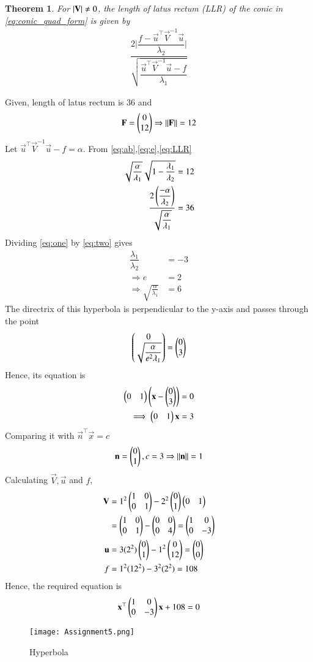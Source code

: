 \documentclass[journal,12pt,twocolumn]{IEEEtran}
\newtheorem{theorem}{Theorem}[section]
\begin{document}
\begin{theorem}
For $\vert\mathbf{V}\vert \ne 0$, the length of latus rectum (LLR) of the conic in \eqref{eq:conic_quad_form} is given by 
\begin{align} 
\dfrac{2\bigg | \dfrac{f-\vec{u}^{\top}\vec{V}^{-1}\vec{u}}{\lambda_2}\bigg | }{{\sqrt{\dfrac{\vec{u}^{\top}\vec{V}^{-1}\vec{u} -f}{\lambda_1}}}}
\label{eq:LLR}
\end{align} 
\end{theorem}
Given, length of latus rectum is 36 and
\begin{align}
    \mathbf{F} =\begin{pmatrix}0\\ 12\end{pmatrix}\Rightarrow\lVert\mathbf{F}\rVert=12
\end{align}
Let $\vec{u}^{\top}\vec{V}^{-1}\vec{u}-f=\alpha$. From \eqref{eq:ab},\eqref{eq:e},\eqref{eq:LLR}
\begin{align}
    \sqrt{\dfrac{\alpha}{\lambda_1}}\sqrt{1-\frac{\lambda_1}{\lambda_2}}=12\label{eq:one}\\
    \dfrac{2\left(\dfrac{-\alpha}{\lambda_2}\right)}{\sqrt{\dfrac{\alpha}{\lambda_1}}}=36\label{eq:two}
\end{align}
Dividing \eqref{eq:one} by \eqref{eq:two} gives
\begin{align}
    \dfrac{\lambda_1}{\lambda_2}&=-3\\
    \Rightarrow e&=2\label{eq:q}\\
    \Rightarrow \sqrt{\frac{\alpha}{\lambda_1}}&=6\label{eq:w}
\end{align}
The directrix of this hyperbola is perpendicular to the y-axis and passes through the point
\begin{align}
\begin{pmatrix}0\\\sqrt{\dfrac{\alpha}{e^2\lambda_1}}\end{pmatrix}=\begin{pmatrix}0\\3\end{pmatrix}
\end{align}
Hence, its equation is
\begin{align}
    \begin{pmatrix}0&1\end{pmatrix}\left(\mathbf{x}-\begin{pmatrix}0\\3\end{pmatrix}\right) = 0\\
    \implies \begin{pmatrix}0&1\end{pmatrix}\mathbf{x} = 3
\end{align}
Comparing it with $\vec{n}^{\top}\vec{x} = c$
\begin{align}
    \mathbf{n} = \begin{pmatrix}0\\1\end{pmatrix}, c = 3\Rightarrow \lVert\mathbf{n}\rVert = 1
\end{align}
Calculating $\vec{V}, \vec{u}$ and $f$,
\begin{align}
    \mathbf{V}&=1^2\begin{pmatrix}1&0\\0&1\end{pmatrix} - 2^2\begin{pmatrix}0\\1\end{pmatrix}\begin{pmatrix}0&1\end{pmatrix}\\
    &=\begin{pmatrix}1&0\\0&1\end{pmatrix}-\begin{pmatrix}0&0\\0&4\end{pmatrix}=\begin{pmatrix}1&0\\0&-3\end{pmatrix}\\
    \mathbf{u}&= 3(2^2)\begin{pmatrix}0\\1\end{pmatrix} - 1^2\begin{pmatrix}0\\12\end{pmatrix}=\begin{pmatrix}0\\0\end{pmatrix}\\
    f &= 1^2(12^2) - 3^2(2^2)= 108
\end{align}
Hence, the required equation is
\begin{align}
    \mathbf{x}^{\top}\begin{pmatrix}1&0\\0&-3\end{pmatrix}\mathbf{x}+108=0
\end{align}
\begin{figure}[!h]
 \centering
 \texttt{[image: Assignment5.png]}
 \caption{Hyperbola}
 \label{plot}
\end{figure}
\end{document}
